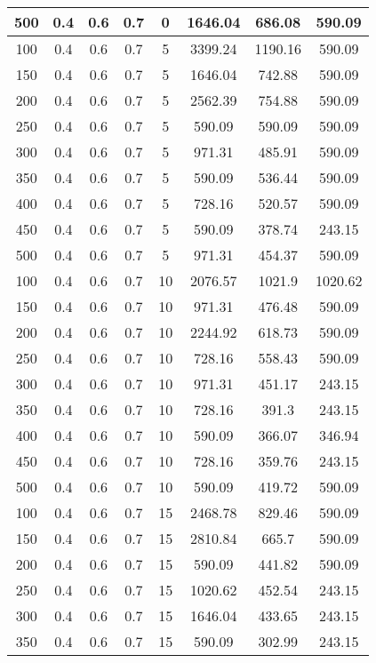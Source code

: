 \documentclass[a4paper, 12pt]{extreport}
\begin{document}
\begin{itemize}
\begin{longtable}{|c|c|c|c|c|c|c|c|}
			500 & 0.4 & 0.6 & 0.7 & 0 & 1646.04 & 686.08 & 590.09 \\\hline
			100 & 0.4 & 0.6 & 0.7 & 5 & 3399.24 & 1190.16 & 590.09 \\\hline
			150 & 0.4 & 0.6 & 0.7 & 5 & 1646.04 & 742.88 & 590.09 \\\hline
			200 & 0.4 & 0.6 & 0.7 & 5 & 2562.39 & 754.88 & 590.09 \\\hline
			250 & 0.4 & 0.6 & 0.7 & 5 & 590.09 & 590.09 & 590.09 \\\hline
			300 & 0.4 & 0.6 & 0.7 & 5 & 971.31 & 485.91 & 590.09 \\\hline
			350 & 0.4 & 0.6 & 0.7 & 5 & 590.09 & 536.44 & 590.09 \\\hline
			400 & 0.4 & 0.6 & 0.7 & 5 & 728.16 & 520.57 & 590.09 \\\hline
			450 & 0.4 & 0.6 & 0.7 & 5 & 590.09 & 378.74 & 243.15 \\\hline
			500 & 0.4 & 0.6 & 0.7 & 5 & 971.31 & 454.37 & 590.09 \\\hline
			100 & 0.4 & 0.6 & 0.7 & 10 & 2076.57 & 1021.9 & 1020.62 \\\hline
			150 & 0.4 & 0.6 & 0.7 & 10 & 971.31 & 476.48 & 590.09 \\\hline
			200 & 0.4 & 0.6 & 0.7 & 10 & 2244.92 & 618.73 & 590.09 \\\hline
			250 & 0.4 & 0.6 & 0.7 & 10 & 728.16 & 558.43 & 590.09 \\\hline
			300 & 0.4 & 0.6 & 0.7 & 10 & 971.31 & 451.17 & 243.15 \\\hline
			350 & 0.4 & 0.6 & 0.7 & 10 & 728.16 & 391.3 & 243.15 \\\hline
			400 & 0.4 & 0.6 & 0.7 & 10 & 590.09 & 366.07 & 346.94 \\\hline
			450 & 0.4 & 0.6 & 0.7 & 10 & 728.16 & 359.76 & 243.15 \\\hline
			500 & 0.4 & 0.6 & 0.7 & 10 & 590.09 & 419.72 & 590.09 \\\hline
			100 & 0.4 & 0.6 & 0.7 & 15 & 2468.78 & 829.46 & 590.09 \\\hline
			150 & 0.4 & 0.6 & 0.7 & 15 & 2810.84 & 665.7 & 590.09 \\\hline
			200 & 0.4 & 0.6 & 0.7 & 15 & 590.09 & 441.82 & 590.09 \\\hline
			250 & 0.4 & 0.6 & 0.7 & 15 & 1020.62 & 452.54 & 243.15 \\\hline
			300 & 0.4 & 0.6 & 0.7 & 15 & 1646.04 & 433.65 & 243.15 \\\hline
			350 & 0.4 & 0.6 & 0.7 & 15 & 590.09 & 302.99 & 243.15 \\\hline

\end{longtable}
\end{itemize}
\end{document}
